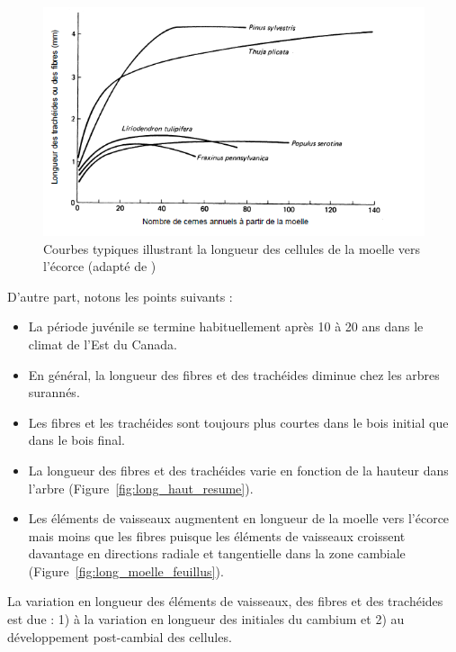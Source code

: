 \begin{figure}[h]
	\centering
	\includegraphics[scale=0.7]{img/ch7_long_moelle}
	\caption{Courbes typiques illustrant la longueur des cellules de la moelle vers l'écorce (adapté de \cite{panshin1980textbook})}
	\label{fig:long_moelle}
\end{figure}


D'autre part, notons les points suivants :

\begin{itemize}
\item La période juvénile se termine habituellement après 10 à 20 ans dans le climat de l'Est du Canada. 
\item En général, la longueur des fibres et des trachéides diminue chez les arbres surannés. 
\item Les fibres et les trachéides sont toujours plus courtes dans le bois initial que dans le bois final.
\item La longueur des fibres et des trachéides varie en fonction de la hauteur dans l'arbre (Figure~\ref{fig:long_haut_resume}).
\item Les éléments de vaisseaux augmentent en longueur de la moelle vers l'écorce mais moins que les fibres puisque les éléments de vaisseaux croissent davantage en directions radiale et tangentielle dans la zone cambiale (Figure~\ref{fig:long_moelle_feuillus}).
\end{itemize}

La variation en longueur des éléments de vaisseaux, des fibres et des trachéides est due : 1) à la variation en longueur des initiales du cambium et 2) au développement post-cambial des cellules.

